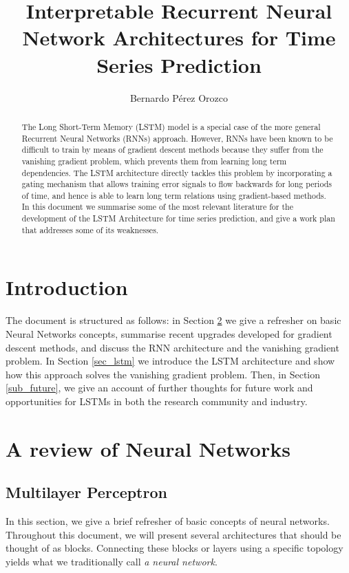 \documentclass[pdftex,12pt,a4paper]{article}
\title{Interpretable Recurrent Neural Network Architectures for Time Series Prediction}
\author{Bernardo P\'erez Orozco}
\date{}
\theoremstyle{definition}
\theoremstyle{remark}
\begin{document}
\maketitle

\begin{abstract}
    The Long Short-Term Memory (LSTM) model is a special case of the more general Recurrent Neural Networks (RNNs) approach. However, RNNs have been known to be difficult to train by means of gradient descent methods because they suffer from the vanishing gradient problem, which prevents them from learning long term dependencies. The LSTM architecture directly tackles this problem by incorporating a gating mechanism that allows training error signals to flow backwards for long periods of time, and hence is able to learn long term relations using gradient-based methods. In this document we summarise some of the most relevant literature for the development of the LSTM Architecture for time series prediction, and give a work plan that addresses some of its weaknesses. 
\end{abstract}

\section{Introduction}

\par The document is structured as follows: in Section \ref{sec_path} we give a refresher on basic Neural Networks concepts, summarise recent upgrades developed for gradient descent methods, and discuss the RNN architecture and the vanishing gradient problem. In Section \ref{sec_lstm} we introduce the LSTM architecture and show how this approach solves the vanishing gradient problem. Then, in Section \ref{sub_future}, we give an account of further thoughts for future work and opportunities for LSTMs in both the research community and industry.

\section{A review of Neural Networks} \label{sec_path}
\subsection{Multilayer Perceptron}
In this section, we give a brief refresher of basic concepts of neural networks. Throughout this document, we will present several architectures that should be thought of as blocks. Connecting these blocks or layers using a specific topology yields what we traditionally call \textit{a neural network}. 
\end{document}

